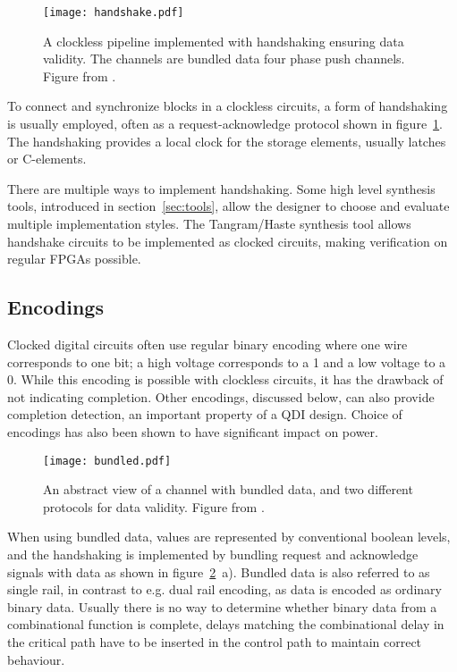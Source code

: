 \begin{figure}[htbp]
  \centering
  \texttt{[image: handshake.pdf]}
  \caption{A clockless pipeline implemented with handshaking ensuring
    data validity. The channels are bundled data four phase push
    channels. Figure from \cite{sparso}.}
  \label{fig:handshake}
\end{figure}

To connect and synchronize blocks in a clockless circuits, a form of
handshaking is usually employed, often as a request-acknowledge
protocol shown in figure~\ref{fig:handshake}. The handshaking provides
a local clock for the storage elements, usually latches or C-elements.

There are multiple ways to implement handshaking. Some high level
synthesis tools, introduced in section~\ref{sec:tools}, allow the
designer to choose and evaluate multiple implementation styles. The
Tangram/Haste synthesis tool allows handshake circuits to be
implemented as clocked circuits, making verification on regular FPGAs
 possible.

\subsection{Encodings}

Clocked digital circuits often use regular binary encoding where one
wire corresponds to one bit; a high voltage corresponds to a 1 and a
low voltage to a 0. While this encoding is possible with clockless
circuits, it has the drawback of not indicating completion. Other
encodings, discussed below, can also provide completion detection, an
important property of a QDI design. Choice of encodings has also been
shown to have significant impact on power.
 
\begin{figure}[htbp]
  \centering
  \texttt{[image: bundled.pdf]}
  \caption{An abstract view of a channel with bundled data, and two
    different protocols for data validity. Figure from \cite{sparso}.}
  \label{fig:bundled}
\end{figure}

When using bundled data, values are represented by conventional
boolean levels, and the handshaking is implemented by bundling request
and acknowledge signals with data as shown in
figure~\ref{fig:bundled}~a). Bundled data is also referred to as
single rail, in contrast to e.g. dual rail encoding, as data is
encoded as ordinary binary data. Usually there is no way to determine
whether binary data from a combinational function is complete, delays
matching the combinational delay in the critical path have to be
inserted in the control path to maintain correct behaviour.

